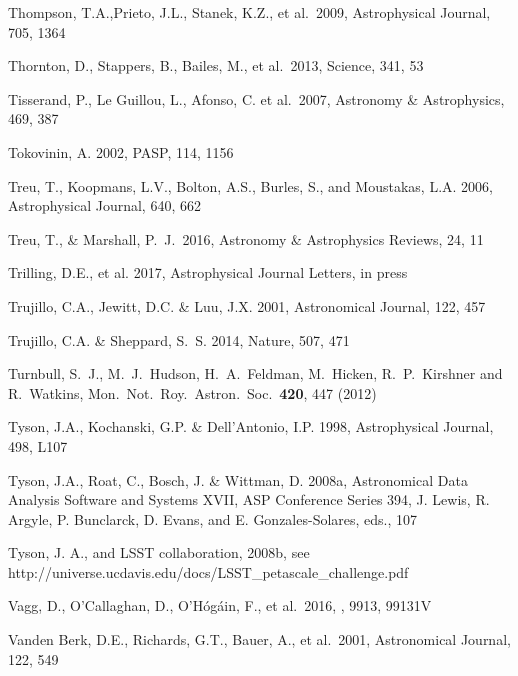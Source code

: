 \documentclass[twocolumn]{aastex61}
\begin{document}
\begin{thebibliography}{}
 Thompson, T.A.,Prieto, J.L., Stanek, K.Z., et al.~2009, Astrophysical Journal, 705, 1364

 Thornton, D., Stappers, B., Bailes, M., et al.~2013, Science, 341, 53

 Tisserand, P., Le Guillou, L., Afonso, C. et al.~2007, Astronomy \& Astrophysics, 469, 387

 Tokovinin, A. 2002, PASP, 114, 1156

 Treu, T., Koopmans, L.V., Bolton, A.S., Burles, S., and  Moustakas, L.A. 2006, Astrophysical Journal, 640, 662

 Treu, T., \& Marshall, P.~J.\ 2016, Astronomy \& Astrophysics Reviews, 24, 11

 Trilling, D.E., et al.  2017, Astrophysical Journal Letters, in press

 Trujillo, C.A., Jewitt, D.C. \& Luu, J.X. 2001, Astronomical Journal, 122, 457

 Trujillo, C.A. \& Sheppard, S.~S. 2014, Nature, 507, 471

 Turnbull, S.~J., M.~J.~Hudson, H.~A.~Feldman, M.~Hicken, R.~P.~Kirshner and R.~Watkins, Mon.\ Not.\ Roy.\ Astron.\ Soc.\  {\bf 420}, 447 (2012)

 Tyson, J.A., Kochanski, G.P. \& Dell'Antonio, I.P. 1998, Astrophysical Journal, 498, L107

 Tyson, J.A., Roat, C., Bosch, J. \& Wittman, D. 2008a, Astronomical Data Analysis Software and Systems XVII, ASP Conference Series 394, J. Lewis, R. Argyle, P. Bunclarck, D. Evans, and E. Gonzales-Solares, eds., 107

 Tyson, J. A., and LSST collaboration, 2008b, see http://universe.ucdavis.edu/docs/LSST\_petascale\_challenge.pdf

 Vagg, D., O'Callaghan, D., O'H{\'o}g{\'a}in, F., et al.\ 2016, \procspie, 9913, 99131V

 Vanden Berk, D.E., Richards, G.T., Bauer, A., et al.~2001, Astronomical Journal, 122, 549


\end{thebibliography}
\end{document}
